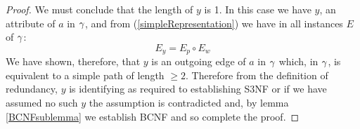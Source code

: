 \begin{proof}
We must conclude that the length of $y$ is 1.
In this case we have $y$, an attribute of $a$ in $\gamma$, and from (\ref{simpleRepresentation})  we have in all instances $E$ of $\gamma$:
\begin{equation}
E_y=E_p \circ E_w
\end{equation}
\noindent
We have shown, therefore, that $y$ is an outgoing edge of $a$ in $\gamma$ 
which, in $\gamma$, is equivalent to a simple path of length $\geq 2$.
Therefore from the definition of redundancy,  $y$ is identifying as required to establishing S3NF
or if we have assumed no such $y$ the assumption is contradicted and, by lemma \ref{BCNFsublemma} we establish BCNF
and so complete the proof.
\end{proof}

